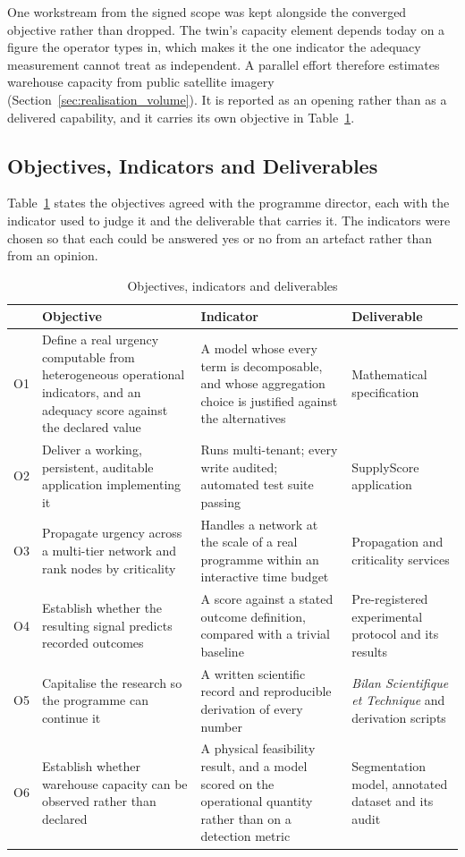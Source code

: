 One workstream from the signed scope was kept alongside the converged objective rather than
dropped. The twin's capacity element depends today on a figure the operator types in, which
makes it the one indicator the adequacy measurement cannot treat as independent. A parallel
effort therefore estimates warehouse capacity from public satellite imagery
(Section~\ref{sec:realisation_volume}). It is reported as an opening rather than as a
delivered capability, and it carries its own objective in Table~\ref{tab:objectifs}.

\subsection{Objectives, Indicators and Deliverables}
\label{sec:objectifs}

Table~\ref{tab:objectifs} states the objectives agreed with the programme director, each
with the indicator used to judge it and the deliverable that carries it. The indicators were
chosen so that each could be answered yes or no from an artefact rather than from an
opinion.

\begin{table}[H]
\centering
\caption{Objectives, indicators and deliverables}
\label{tab:objectifs}
\small
\begin{tabularx}{\linewidth}{>{\raggedright\arraybackslash}p{0.8cm} >{\raggedright\arraybackslash}p{4.3cm} >{\raggedright\arraybackslash}X >{\raggedright\arraybackslash}p{3.0cm}}
\toprule
& \textbf{Objective} & \textbf{Indicator} & \textbf{Deliverable} \\
\midrule
O1 & Define a real urgency computable from heterogeneous operational indicators, and an
adequacy score against the declared value & A model whose every term is decomposable, and
whose aggregation choice is justified against the alternatives & Mathematical specification
\\
O2 & Deliver a working, persistent, auditable application implementing it & Runs
multi-tenant; every write audited; automated test suite passing & SupplyScore application \\
O3 & Propagate urgency across a multi-tier network and rank nodes by criticality & Handles a
network at the scale of a real programme within an interactive time budget & Propagation and
criticality services \\
O4 & Establish whether the resulting signal predicts recorded outcomes & A score against a
stated outcome definition, compared with a trivial baseline & Pre-registered experimental
protocol and its results \\
O5 & Capitalise the research so the programme can continue it & A written scientific record
and reproducible derivation of every number & \emph{Bilan Scientifique et Technique} and
derivation scripts \\
O6 & Establish whether warehouse capacity can be observed rather than declared & A physical
feasibility result, and a model scored on the operational quantity rather than on a detection
metric & Segmentation model, annotated dataset and its audit \\
\bottomrule
\end{tabularx}
\end{table}

